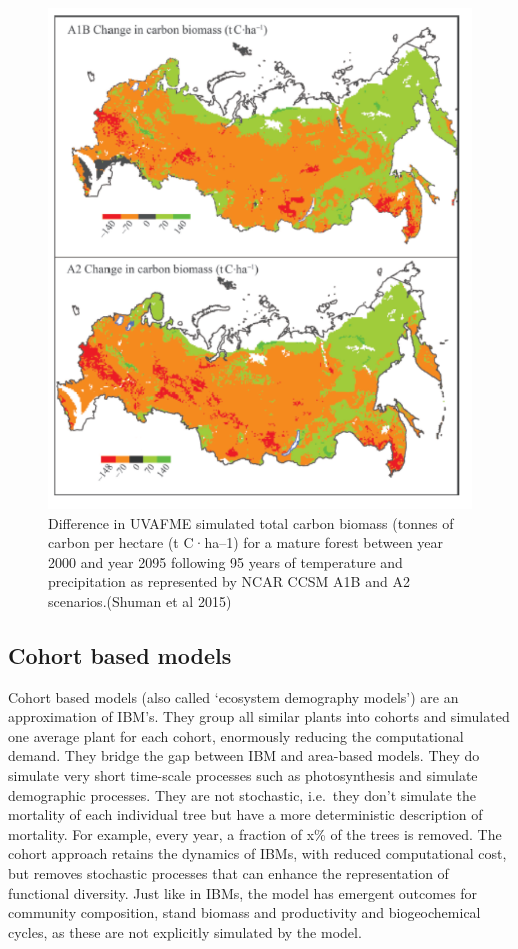 \documentclass[12pt,oneside]{book}
\begin{document}
\begin{figure}

{\centering \includegraphics[width=0.8\linewidth]{figures/chap6/f614_uvafme_russia} 

}

\caption{Difference in UVAFME simulated total carbon biomass (tonnes of carbon per hectare (t C·ha–1) for a mature forest between year 2000 and year 2095 following 95 years of temperature and precipitation as represented by NCAR CCSM A1B and A2 scenarios.(Shuman et al 2015)}\label{fig:f614}
\end{figure}

\subsection{Cohort based models}\label{cohort-based-models}

Cohort based models (also called `ecosystem demography models') are an
approximation of IBM's. They group all similar plants into cohorts and
simulated one average plant for each cohort, enormously reducing the
computational demand. They bridge the gap between IBM and area-based
models. They do simulate very short time-scale processes such as
photosynthesis and simulate demographic processes. They are not
stochastic, i.e.~they don't simulate the mortality of each individual
tree but have a more deterministic description of mortality. For
example, every year, a fraction of x\% of the trees is removed. The
cohort approach retains the dynamics of IBMs, with reduced computational
cost, but removes stochastic processes that can enhance the
representation of functional diversity. Just like in IBMs, the model has
emergent outcomes for community composition, stand biomass and
productivity and biogeochemical cycles, as these are not explicitly
simulated by the model.
\end{document}
